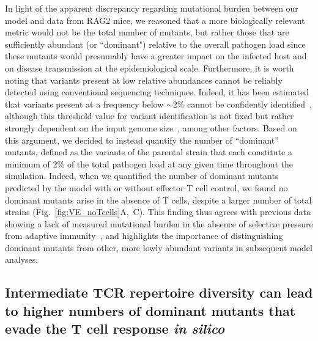 In light of the apparent discrepancy regarding mutational burden between our model and data from RAG2\KO{} mice, we reasoned that a more biologically relevant metric would not be the total number of mutants, but rather those that are sufficiently abundant (or ``dominant") relative to the overall pathogen load since these mutants would presumably have a greater impact on the infected host and on disease transmission at the epidemiological scale. Furthermore, it is worth noting that variants present at low relative abundances cannot be reliably detected using conventional sequencing techniques. Indeed, it has been estimated that variants present at a frequency below $\sim$2\% cannot be confidently identified~\cite{lauring2020within}, although this threshold value for variant identification is not fixed but rather strongly dependent on the input genome size~\cite{mccrone2016measurements}, among other factors. Based on this argument, we decided to instead quantify the number of ``dominant'' mutants, defined as the variants of the parental strain that each constitute a minimum of 2\% of the total pathogen load at any given time throughout the simulation. Indeed, when we quantified the number of dominant mutants predicted by the model with or without effector T cell control, we found no dominant mutants arise in the absence of T cells, despite a larger number of total strains (Fig.~\ref{fig:VE_noTcells}A,~C). This finding thus agrees with previous data showing a lack of measured mutational burden in the absence of selective pressure from adaptive immunity~\cite{smyth2021characterization}, and highlights the importance of distinguishing dominant mutants from other, more lowly abundant variants in subsequent model analyses.

\subsection{Intermediate TCR repertoire diversity can lead to higher numbers of dominant mutants that evade the T cell response \textit{in silico}}

